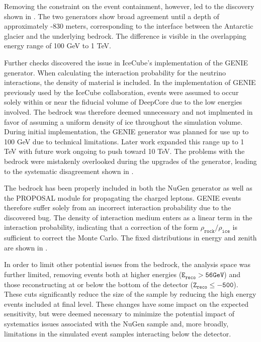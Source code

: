 Removing the constraint on the event containment, however, led to the discovery shown in .
The two generators show broad agreement until a depth of approximately -830 meters, corresponding to the interface between the Antarctic glacier and the underlying bedrock.
The difference is visible in the overlapping energy range of 100 GeV to 1 TeV.

Further checks discovered the issue in IceCube's implementation of the GENIE generator.
When calculating the interaction probability for the neutrino interactions, the density of material is included.
In the implementation of GENIE previously used by the IceCube collaboration, events were assumed to occur solely within or near the fiducial volume of DeepCore due to the low energies involved.
The bedrock was therefore deemed unnecessary and not implmented in favor of assuming a uniform density of ice throughout the simulation volume.
During initial implementation, the GENIE generator was planned for use up to 100 GeV due to technical limitations. 
Later work expanded this range up to 1 TeV with future work ongoing to push toward 10 TeV.
The problems with the bedrock were mistakenly overlooked during the upgrades of the generator, leading to the systematic disagreement shown in .

The bedrock has been properly included in both the NuGen generator as well as the PROPOSAL module for propagating the charged leptons.
GENIE events therefore suffer solely from an incorrect interaction probability due to the discovered bug.
The density of interaction medium enters as a linear term in the interaction probability, indicating that a correction of the form $\mathtt{\rho_{rock}/\rho_{ice}}$ is sufficient to correct the Monte Carlo.
The fixed distributions in energy and zenith are shown in .

In order to limit other potential issues from the bedrock, the analysis space was further limited, removing events both at higher energies ($\mathtt{E_{reco}>56 GeV}$) and those reconstructing at or below the bottom of the detector ($\mathtt{Z_{reco}\leq-500}$).
These cuts significantly reduce the size of the sample by reducing the high energy events included at final level. 
These changes have some impact on the expected sensitivity, but were deemed necessary to minimize the potential impact of systematics issues associated with the NuGen sample and, more broadly, limitations in the simulated event samples interacting below the detector.

